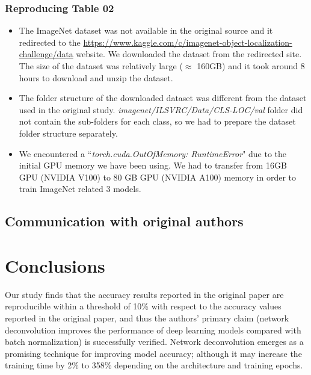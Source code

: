 \subsubsection{Reproducing Table 02}

\begin{itemize}
    \item The ImageNet dataset was not available in the original source and it redirected to the \url{https://www.kaggle.com/c/imagenet-object-localization-challenge/data} website. We downloaded the dataset from the redirected site. The size of the dataset was relatively large ($\approx$ 160GB) and it took around 8 hours to download and unzip the dataset.
    \item The folder structure of the downloaded dataset was different from the dataset used in the original study. \textit{imagenet/ILSVRC/Data/CLS-LOC/val} folder did not contain the sub-folders for each class, so we had to prepare the dataset folder structure separately. 
    \item We encountered a ``\textit{torch.cuda.OutOfMemory: RuntimeError}" due to the initial GPU memory we have been using. We had to transfer from 16GB GPU (NVIDIA V100) to 80 GB GPU (NVIDIA A100) memory in order to train ImageNet related 3 models.
\end{itemize}


\subsection{Communication with original authors}


\section{Conclusions}
Our study finds that the accuracy results reported in the original paper are reproducible within a threshold of 10\% with respect to the accuracy values reported in the original paper, and thus the authors' primary claim (network deconvolution improves the performance of deep learning models compared with batch normalization) is successfully verified. Network deconvolution emerges as a promising technique for improving model accuracy; although it may increase the training time by 2\% to 358\% depending on the architecture and training epochs.
